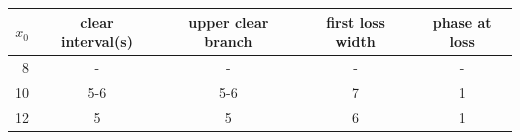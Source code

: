 \begin{tabular}{rcccc}
\toprule
$x_0$ & clear interval(s) & upper clear branch & first loss width & phase at loss \\
\midrule
8 & - & - & - & - \\
10 & 5-6 & 5-6 & 7 & 1 \\
12 & 5 & 5 & 6 & 1 \\
\bottomrule
\end{tabular}